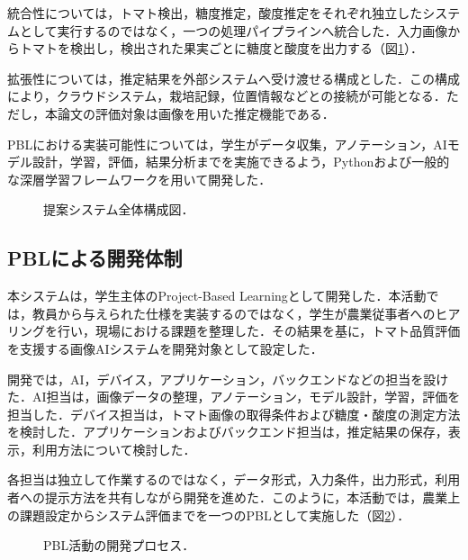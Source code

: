 \documentclass[authorproof,JRM,paper]{fujipressarticle}
\begin{document}
統合性については，トマト検出，糖度推定，酸度推定をそれぞれ独立したシステムとして実行するのではなく，一つの処理パイプラインへ統合した．入力画像からトマトを検出し，検出された果実ごとに糖度と酸度を出力する（図\ref{fig:system_overview}）．

拡張性については，推定結果を外部システムへ受け渡せる構成とした．この構成により，クラウドシステム，栽培記録，位置情報などとの接続が可能となる．ただし，本論文の評価対象は画像を用いた推定機能である．

PBLにおける実装可能性については，学生がデータ収集，アノテーション，AIモデル設計，学習，評価，結果分析までを実施できるよう，Pythonおよび一般的な深層学習フレームワークを用いて開発した．

\begin{figure}[t]
\centering
{}
\caption{提案システム全体構成図．}
\label{fig:system_overview}
\end{figure}

\subsection{PBLによる開発体制}

本システムは，学生主体のProject-Based Learningとして開発した．本活動では，教員から与えられた仕様を実装するのではなく，学生が農業従事者へのヒアリングを行い，現場における課題を整理した．その結果を基に，トマト品質評価を支援する画像AIシステムを開発対象として設定した．

開発では，AI，デバイス，アプリケーション，バックエンドなどの担当を設けた．AI担当は，画像データの整理，アノテーション，モデル設計，学習，評価を担当した．デバイス担当は，トマト画像の取得条件および糖度・酸度の測定方法を検討した．アプリケーションおよびバックエンド担当は，推定結果の保存，表示，利用方法について検討した．

各担当は独立して作業するのではなく，データ形式，入力条件，出力形式，利用者への提示方法を共有しながら開発を進めた．このように，本活動では，農業上の課題設定からシステム評価までを一つのPBLとして実施した（図\ref{fig:pbl_process}）．

\begin{figure}[t]
\centering
{}
\caption{PBL活動の開発プロセス．}
\label{fig:pbl_process}
\end{figure}
\end{document}
